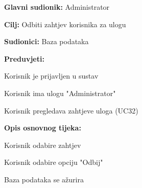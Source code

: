 					\noindent {}
					\begin{packed_item}
	
						\item \textbf{Glavni sudionik: } Administrator
						\item  \textbf{Cilj:} Odbiti zahtjev korisnika za ulogu
						\item  \textbf{Sudionici:} Baza podataka
						\item  \textbf{Preduvjeti:}
						\item[] \begin{packed_enum}
							\item Korisnik je prijavljen u sustav
							\item Korisnik ima ulogu "Administrator"
							\item Korisnik pregledava zahtjeve uloga (UC32)
						\end{packed_enum}
						\item  \textbf{Opis osnovnog tijeka:}
						
						\item[] \begin{packed_enum}
	
							\item Korisnik odabire zahtjev
							\item Korisnik odabire opciju "Odbij"
							\item Baza podataka se ažurira
						\end{packed_enum}
					
					\end{packed_item}
					
